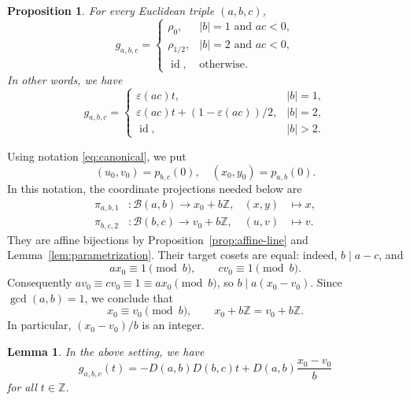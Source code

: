 \documentclass[12pt,letterpaper]{article}
\numberwithin{equation}{section}
\newcommand{\Z}{\mathbb Z}
\newcommand{\B}{\mathcal B}
\newcommand{\id}{\operatorname{id}}
\newcommand{\eps}{\varepsilon}
\theoremstyle{plain}
\newtheorem{proposition}[theorem]{Proposition}
\newtheorem{lemma}[theorem]{Lemma}
\theoremstyle{definition}
\begin{document}
\begin{proposition}\label{prop:local}
For every Euclidean triple $(a,b,c)$,
\[
 g_{a,b,c}=
 \begin{cases}
  \rho_0,& |b|=1\text{ and }ac<0,\\
  \rho_{1/2},& |b|=2\text{ and }ac<0,\\
  \id,&\text{otherwise.}
 \end{cases}
\]
In other words, we have 
\begin{equation}\label{eq:local-classification}
g_{a,b,c}=
 \begin{cases}
  \eps(ac)t,& |b|=1,\\
  \eps(ac)t+(1-\eps(ac))/2,& |b|=2,\\
  \id,& |b|>2.
 \end{cases} 
\end{equation}
\end{proposition}

Using notation \eqref{eq:canonical}, we put 
\[
(u_0,v_0)=p_{b,c}(0),\quad (x_0,y_0)=p_{a,b}(0).
\]
In this notation, the coordinate projections needed below are
\[
 \begin{aligned}
 \pi_{a,b,1}&:\B(a,b)\longrightarrow x_0+b\Z,
 &(x,y)&\longmapsto x,\\
 \pi_{b,c,2}&:\B(b,c)\longrightarrow v_0+b\Z,
 &(u,v)&\longmapsto v.
 \end{aligned}
\]
They are affine bijections by Proposition~\ref{prop:affine-line} and Lemma~\ref{lem:parametrization}. Their target cosets are equal: indeed, $b\mid a-c$, and
\[
 ax_0\equiv1\pmod b,\qquad cv_0\equiv1\pmod b.
\]
Consequently $av_0\equiv cv_0\equiv1\equiv ax_0\pmod b$, so
$b\mid a(x_0-v_0)$. Since $\gcd(a,b)=1$, we conclude that
\[
 x_0\equiv v_0\pmod b,
 \qquad x_0+b\Z=v_0+b\Z.
\]
In particular, $(x_0-v_0)/b$ is an integer.

\begin{lemma}\label{lem:gabc}
In the above setting, we have 
\[
 g_{a,b,c}(t)=-D(a,b)D(b,c)t+D(a,b)\frac{x_0-v_0}{b}
\]
for all $t\in\Z$.
\end{lemma}
\end{document}
